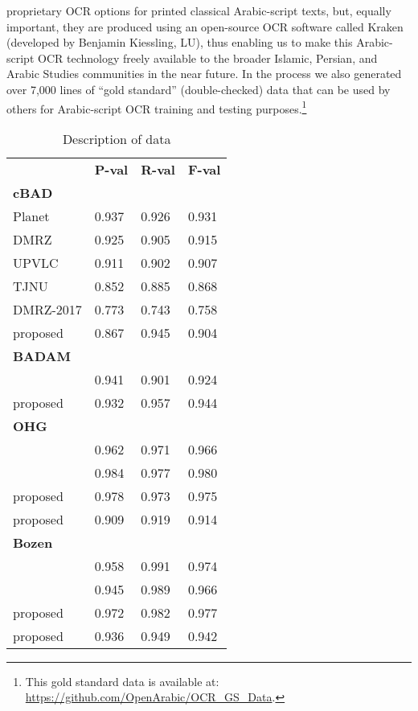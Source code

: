 proprietary OCR options for printed classical Arabic-script texts, but, equally
important, they are produced using an open-source OCR software called Kraken
(developed by Benjamin Kiessling, LU), thus enabling us to make this
Arabic-script OCR technology freely available to the broader Islamic, Persian,
and Arabic Studies communities in the near future. In the process we also
generated over 7,000 lines of “gold standard” (double-checked) data that can be
used by others for Arabic-script OCR training and testing
purposes.\footnote{This gold standard data is available at:
\url{https://github.com/OpenArabic/OCR_GS_Data}.}

\begin{table}[h!]
\begin{center}
\caption{Description of data}
\label{tab:soa_tab1}
\begin{tabularx}{\columnwidth}{lp{1.7cm}p{1.7cm}p{1.7cm}} \toprule
& \textbf{P-val} & \textbf{R-val} & \textbf{F-val}\\
\addlinespace
\textbf{cBAD}\ \\ \midrule
Planet & 0.937 & 0.926 & 0.931\\
DMRZ & 0.925 & 0.905 & 0.915\\
UPVLC &0.911 & 0.902 & 0.907\\
TJNU & 0.852 & 0.885 & 0.868\\
DMRZ-2017 & 0.773 & 0.743 & 0.758\\
proposed\footnotemark[3] & 0.867 & 0.945 & 0.904\\
\addlinespace
\textbf{BADAM}\ \\ \midrule
\cite{kiessling2019badam} & 0.941 & 0.901 & 0.924\\
proposed & 0.932 & 0.957 & 0.944\\
\addlinespace
\textbf{OHG}\ \\ \midrule
\cite{quiros2018multi} & 0.962 & 0.971 & 0.966\\
\cite{quiros2018multi}\footnotemark[4] & 0.984 & 0.977 & 0.980\\
proposed & 0.978 & 0.973 & 0.975\\
proposed\footnotemark[4] & 0.909 & 0.919 & 0.914\\
\addlinespace
\textbf{Bozen}\ \\ \midrule
\cite{quiros2018multi} & 0.958 & 0.991 & 0.974\\
\cite{quiros2018multi}\footnotemark[4] & 0.945 & 0.989 & 0.966 \\
proposed & 0.972 & 0.982 & 0.977 \\
proposed\footnotemark[4] & 0.936 & 0.949 & 0.942\\
\bottomrule
\end{tabularx}
\end{center}
\end{table}


